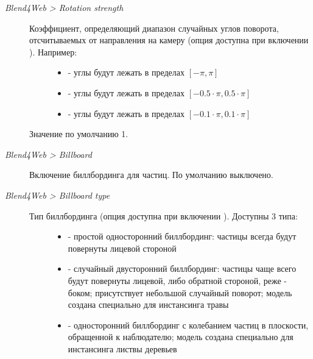 \documentclass[a4paper,12pt,oneside]{sphinxmanual}
\begin{document}
\begin{description}
\item[{\emph{Blend4Web \textgreater{} Rotation strength}}] \leavevmode\begin{description}
\item[{Коэффициент, определяющий диапазон случайных углов поворота, отсчитываемых от направления на камеру (опция доступна при включении ). Например:}] \leavevmode\begin{itemize}
\item {} 
 - углы будут лежать в пределах \([-\pi, \pi]\)

\item {} 
 - углы будут лежать в пределах \([-0.5 \cdot \pi, 0.5 \cdot \pi]\)

\item {} 
 - углы будут лежать в пределах \([-0.1 \cdot \pi, 0.1 \cdot \pi]\)

\end{itemize}

\end{description}

Значение по умолчанию 1.

\item[{\emph{Blend4Web \textgreater{} Billboard}}] \leavevmode
Включение биллбординга для частиц. По умолчанию выключено.

\item[{\emph{Blend4Web \textgreater{} Billboard type}}] \leavevmode\begin{description}
\item[{Тип биллбординга (опция доступна при включении ). Доступны 3 типа:}] \leavevmode\begin{itemize}
\item {} 
 - простой односторонний биллбординг: частицы всегда будут повернуты лицевой стороной

\item {} 
 - случайный двусторонний биллбординг: частицы чаще всего будут повернуты лицевой, либо обратной стороной, реже - боком; присутствует небольшой случайный поворот; модель создана специально для инстансинга травы

\item {} 
 - односторонний биллбординг с колебанием частиц в плоскости, обращенной к наблюдателю; модель создана специально для инстансинга листвы деревьев


\end{itemize}
\end{description}
\end{description}
\end{document}
